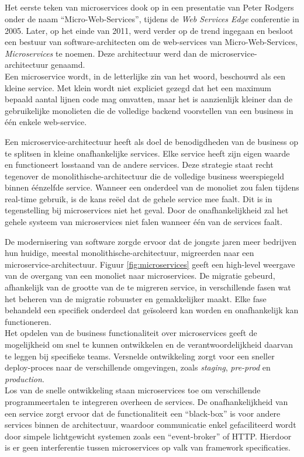 \subsection{}
\label{subsec:microservice-architectuur}

Het eerste teken van microservices dook op in een presentatie van Peter Rodgers onder de naam ``Micro-Web-Services'', tijdens de \emph{Web Services Edge} conferentie in 2005. Later, op het einde van 2011, werd verder op de trend ingegaan en besloot een bestuur van software-architecten om de web-services van Micro-Web-Services, \emph{Microservices} te noemen. Deze architectuur werd dan de microservice-architectuur genaamd. \\
Een microservice wordt, in de letterlijke zin van het woord, beschouwd als een kleine service. Met klein wordt niet expliciet gezegd dat het een maximum bepaald aantal lijnen code mag omvatten, maar het is aanzienlijk kleiner dan de gebruikelijke monolieten die de volledige backend voorstellen van een business in één enkele web-service.

Een microservice-architectuur heeft als doel de benodigdheden van de business op te splitsen in kleine onafhankelijke services. Elke service heeft zijn eigen waarde en functioneert losstaand van de andere services. Deze strategie staat recht tegenover de monolithische-architectuur die de volledige business weerspiegeld binnen éénzelfde service. Wanneer een onderdeel van de monoliet zou falen tijdens real-time gebruik, is de kans reëel dat de gehele service mee faalt. Dit is in tegenstelling bij microservices niet het geval. Door de onafhankelijkheid zal het gehele systeem van microservices niet falen wanneer één van de services faalt.

De modernisering van software zorgde ervoor dat de jongste jaren meer bedrijven hun huidige, meestal monolithische-architectuur, migreerden naar een microservice-architectuur. Figuur \ref{fig:microservices} geeft een high-level weergave van de overgang van een monoliet naar microservices. De migratie gebeurd, afhankelijk van de grootte van de te migreren service, in verschillende fasen wat het beheren van de migratie robuuster en gemakkelijker maakt. Elke fase behandeld een specifiek onderdeel dat geïsoleerd kan worden en onafhankelijk kan functioneren. \\
Het opdelen van de business functionaliteit over microservices geeft de mogelijkheid om snel te kunnen ontwikkelen en de verantwoordelijkheid daarvan te leggen bij specifieke teams. Versnelde ontwikkeling zorgt voor een sneller deploy-proces naar de verschillende omgevingen, zoals \emph{staging}, \emph{pre-prod} en \emph{production}. \\
Los van de snelle ontwikkeling staan microservices toe om verschillende programmeertalen te integreren overheen de services. De onafhankelijkheid van een service zorgt ervoor dat de functionaliteit een ``black-box'' is voor andere services binnen de architectuur, waardoor communicatie enkel gefaciliteerd wordt door simpele lichtgewicht systemen zoals een ``event-broker'' of \gls{HTTP}. Hierdoor is er geen interferentie tussen microservices op valk van framework specificaties.


